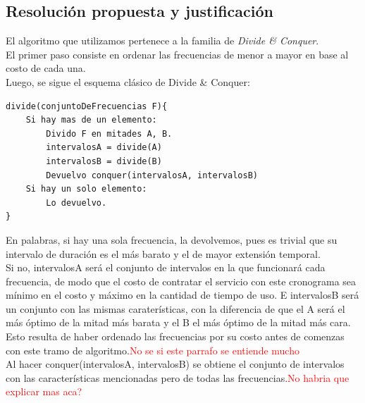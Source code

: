 \newpage

\subsection{Resoluci\'on propuesta y justificaci\'on}

El algoritmo que utilizamos pertenece a la familia de \emph{Divide \& Conquer}.\\


El primer paso consiste en ordenar las frecuencias de menor a mayor en base al costo de cada una.\\

Luego, se sigue el esquema cl\'asico de Divide \& Conquer:\\

	\begin{codesnippet}
	\begin{verbatim}
divide(conjuntoDeFrecuencias F){
    Si hay mas de un elemento:
        Divido F en mitades A, B.
        intervalosA = divide(A)
        intervalosB = divide(B)
        Devuelvo conquer(intervalosA, intervalosB)
    Si hay un solo elemento:
        Lo devuelvo.	
}
	\end{verbatim}
	\end{codesnippet}

En palabras, si hay una sola frecuencia, la devolvemos, pues es trivial que su intervalo de duraci\'on es el m\'as barato y el de mayor extensi\'on temporal.\\

Si no, intervalosA ser\'a el conjunto de intervalos en la que funcionar\'a cada frecuencia, de modo que el costo de contratar el servicio con este cronograma sea m\'inimo en el costo y m\'aximo en la cantidad de tiempo de uso. E intervalosB ser\'a un conjunto con las mismas carater\'isticas, con la diferencia de que el A ser\'a el m\'as \'optimo de la mitad m\'as barata y el B el m\'as \'optimo de la mitad m\'as cara. Esto resulta de haber ordenado las frecuencias por su costo antes de comenzas con este tramo de algoritmo.\textcolor{red}{No se si este parrafo se entiende mucho}\\

Al hacer conquer(intervalosA, intervalosB) se obtiene el conjunto de intervalos con las caracter\'isticas mencionadas pero de todas las frecuencias.\textcolor{red}{No habria que explicar mas aca?}\\

